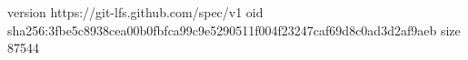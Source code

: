 version https://git-lfs.github.com/spec/v1
oid sha256:3fbe5c8938cea00b0fbfca99c9e5290511f004f23247caf69d8c0ad3d2af9aeb
size 87544
